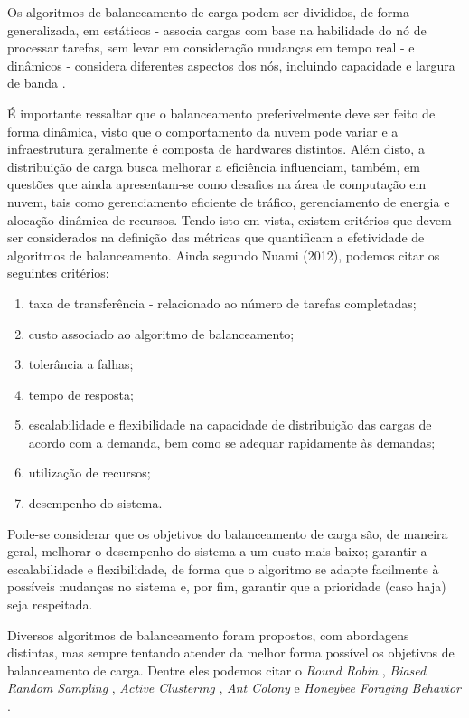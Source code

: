 Os algoritmos de balanceamento de carga podem ser divididos, de forma generalizada, em estáticos - associa cargas com base na habilidade do nó de processar tarefas, sem levar em consideração mudanças em tempo real - e dinâmicos - considera diferentes aspectos dos nós, incluindo capacidade e largura de banda \cite{surveycloud:2012}. 

É importante ressaltar que o balanceamento preferivelmente deve ser feito de forma dinâmica, visto que o comportamento da nuvem pode variar e a infraestrutura geralmente é composta de hardwares distintos. Além disto, a distribuição de carga busca melhorar a eficiência influenciam, também, em questões que ainda apresentam-se como desafios na área de computação em nuvem, tais como gerenciamento eficiente de tráfico, gerenciamento de energia e alocação dinâmica de recursos\cite{zhang2010cloud}. Tendo isto em vista, existem critérios que devem ser considerados na definição das métricas que quantificam a efetividade de algoritmos de balanceamento. Ainda segundo Nuami (2012), podemos citar os seguintes critérios: 

\begin{enumerate}
	\item taxa de transferência - relacionado ao número de tarefas completadas; 
	\item custo associado ao algoritmo de balanceamento; 
	\item tolerância a falhas;
	\item tempo de resposta; 
	\item escalabilidade e flexibilidade na capacidade de distribuição das cargas de acordo com a demanda, bem como se adequar rapidamente às demandas; 
	\item utilização de recursos;
	\item desempenho do sistema. 	
\end{enumerate}


Pode-se considerar que os objetivos do balanceamento de carga são, de maneira geral, melhorar o desempenho do sistema a um custo mais baixo; garantir a escalabilidade e flexibilidade, de forma que o algoritmo se adapte facilmente à possíveis mudanças no sistema e, por fim, garantir que a prioridade (caso haja) seja respeitada\cite{kaur2012load}. 

Diversos algoritmos de balanceamento foram propostos, com abordagens distintas, mas sempre tentando atender da melhor forma possível os objetivos de balanceamento de carga. Dentre eles podemos citar o \textit{Round Robin} \cite{soni2014novel}, \textit{Biased Random Sampling} \cite{randles2010comparative}, \textit{Active Clustering} \cite{randles2010comparative}, \textit{Ant Colony}\cite{nishant2012load} e \textit{Honeybee Foraging Behavior} \cite{randles2010comparative}.  

